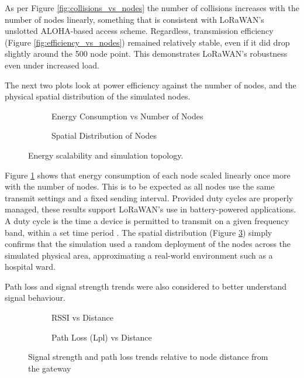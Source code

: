 As per Figure \ref{fig:collisions_vs_nodes} the number of collisions increases with the number of nodes linearly, something that is consistent with LoRaWAN's unslotted ALOHA-based access scheme. Regardless, transmission efficiency (Figure \ref{fig:efficiency_vs_nodes}) remained relatively stable, even if it did drop slightly around the 500 node point. This demonstrates LoRaWAN's robustness even under increased load.

\vspace{1em} \noindent The next two plots look at power efficiency against the number of nodes, and the physical spatial distribution of the simulated nodes.

\begin{figure}[H]
\centering
\begin{subfigure}{0.48\textwidth}
	\centering
	
	\caption{Energy Consumption vs Number of Nodes}
	\label{fig:energy_vs_nodes}
\end{subfigure}
\hfill
\begin{subfigure}{0.48\textwidth}
	\centering
	
	\caption{Spatial Distribution of Nodes}
	\label{fig:spatial_distribution}
\end{subfigure}
\caption{Energy scalability and simulation topology.}
\end{figure}

Figure \ref{fig:energy_vs_nodes} shows that energy consumption of each node scaled linearly once more with the number of nodes. This is to be expected as all nodes use the same transmit settings and a fixed sending interval. Provided duty cycles are properly managed, these results support LoRaWAN's use in battery-powered applications. A duty cycle is the time a device is permitted to transmit on a given frequency band, within a set time period \cite{duty_cycles}. The spatial distribution (Figure \ref{fig:spatial_distribution}) simply confirms that the simulation used a random deployment of the nodes across the simulated physical area, approximating a real-world environment such as a hospital ward.

\vspace{1em} \noindent Path loss and signal strength trends were also considered to better understand signal behaviour.
\begin{figure}[H]
\centering
\begin{subfigure}{0.48\textwidth}
	\centering
	
	\caption{RSSI vs Distance}
	\label{fig:rssi_vs_distance}
\end{subfigure}
\hfill
\begin{subfigure}{0.48\textwidth}
	\centering
	
	\caption{Path Loss (Lpl) vs Distance}
	\label{fig:lpl_vs_distance}
\end{subfigure}
\caption{Signal strength and path loss trends relative to node distance from the gateway}
\end{figure}

